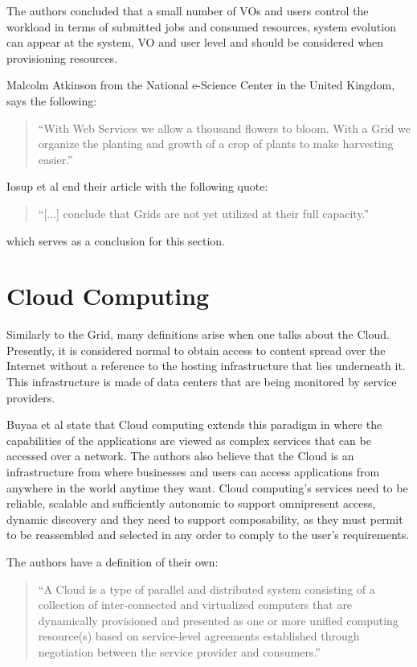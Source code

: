 The authors concluded that a small number of VOs and users control the workload in terms of submitted jobs and consumed resources, system evolution can appear at the system, VO and user level and should be considered when provisioning resources.\cite{iosup}

Malcolm Atkinson from the National e-Science Center in the United Kingdom, says the following:
\begin{quote}
``With Web Services we allow a thousand flowers to bloom. With a Grid we organize the planting and growth of a crop of plants to make harvesting easier.''\cite{stockinger}
\end{quote}

Iosup et al end their article with the following quote:

\begin{quote}
``[...] conclude that Grids are not yet utilized at their full capacity.''\cite{iosup}
\end{quote}

which serves as a conclusion for this section.



\section{Cloud Computing} \label{sec:cloud}

Similarly to the Grid, many definitions arise when one talks about the Cloud. Presently, it is considered normal to obtain access to content spread over the Internet without a reference to the hosting infrastructure that lies underneath it. This infrastructure is made of data centers that are being monitored by service providers. 

Buyaa et al state that Cloud computing extends this paradigm in where the capabilities of the applications are viewed as complex services that can be accessed over a network. The authors also believe that the Cloud is an infrastructure from where businesses and users can access applications from anywhere in the world anytime they want. Cloud computing's services need to be reliable, scalable and sufficiently autonomic to support omnipresent access, dynamic discovery and they need to support composability, as they must permit to be reassembled and selected in any order to comply to the user's requirements.

The authors have a definition of their own:

\begin{quote}
``A Cloud is a type of parallel and distributed system consisting of a collection of inter-connected and virtualized computers that are dynamically provisioned and presented as one or more unified computing resource(s) based on service-level agreements established through negotiation between the service provider and consumers.'' \cite{Buyya2009599}
\end{quote}

